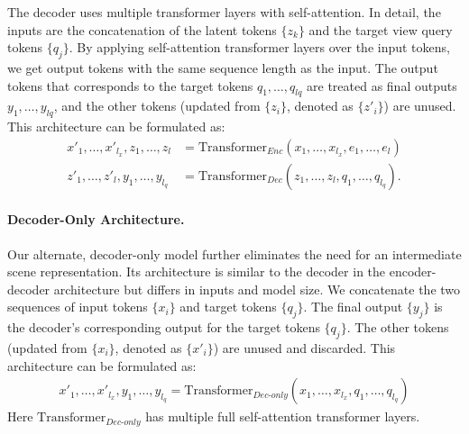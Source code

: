 The decoder uses multiple transformer layers with self-attention.
In detail, the inputs are the concatenation of the latent tokens $\{z_k\}$ and the target view query tokens $\{q_j\}$. 
By applying self-attention transformer layers over the input tokens, we get output tokens with the same sequence length as the input. 
The output tokens that corresponds to the target tokens $q_1, \ldots, q_\mathit{lq}$ are treated as final outputs $y_1, \ldots, y_\mathit{lq}$, and the other tokens (updated from $\{z_i\}$, denoted as $\{z'_i\}$) are unused.
This architecture can be formulated as:
\begin{align}
    x'_1, \ldots, x'_\mathit{l_x}, z_1, \ldots, z_\mathit{l}  & = \mathrm{Transformer}_\mathit{Enc} (x_1, \ldots, x_\mathit{l_x}, e_1, \ldots, e_\mathit{l}) \\
    z'_1, \ldots, z'_{l}, y_1, \ldots, y_\mathit{l_q} &= \mathrm{Transformer}_\mathit{Dec} (z_1, \ldots, z_{l}, q_1, \ldots, q_\mathit{l_q}).
\end{align}



\paragraph{Decoder-Only Architecture.} Our alternate, decoder-only model further eliminates the need for an intermediate scene representation. Its architecture is similar to the decoder in the encoder-decoder architecture but differs in inputs and model size.
We concatenate the two sequences of input tokens $\{x_i\}$ and target tokens $\{q_j\}$.
The final output $\{y_j\}$ is the decoder's corresponding output for the target tokens $\{q_j\}$. The other tokens (updated from $\{x_i\}$, denoted as $\{x'_i\}$) are unused and discarded. This architecture can be formulated as:
\begin{align}
    x'_1, \ldots, x'_\mathit{l_x}, y_1, \ldots, y_\mathit{l_q}  = \mathrm{Transformer}_\mathit{Dec\mbox{-}only} ( x_1, \ldots, x_\mathit{l_x}, q_1, \ldots, q_\mathit{l_q})
\end{align}
Here $\mathrm{Transformer}_\mathit{Dec\mbox{-}only}$ has multiple full self-attention transformer layers.
